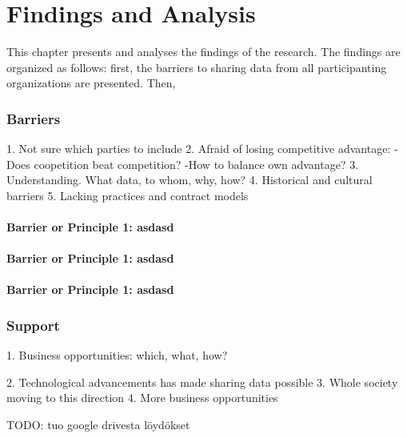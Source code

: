 \chapter{Findings and Analysis}

This chapter presents and analyses the findings of the research. The findings are organized as follows: first, the barriers to sharing data from all participanting organizations are presented. Then, 


\label{chapter:results}




\subsection{Barriers}
1. Not sure which parties to include
2. Afraid of losing competitive advantage:
	-Does coopetition beat competition?
	-How to balance own advantage?
3. Understanding. What data, to whom, why, how?
4. Historical and cultural barriers
5. Lacking practices and contract models

\subsubsection{Barrier or Principle 1: asdasd}

\subsubsection{Barrier or Principle 1: asdasd}
\subsubsection{Barrier or Principle 1: asdasd}



\subsection{Support}

1. Business opportunities:
which, what, how?


2. Technological advancements has made sharing data possible
3. Whole society moving to this direction
4. More business opportunities






TODO: tuo google drivesta löydökset